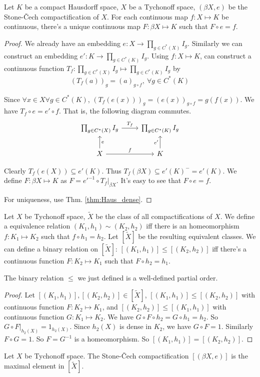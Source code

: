 \documentclass[12pt]{book}
\begin{document}
\begin{theorem}
	Let $K$ be a compact Hausdorff space, $X$ be a Tychonoff space, $(\beta X,e)$ be the Stone-\v Cech compactification of $X$. For each continuous map $f:X\mapsto K$ be continuous, there's a unique continuous map $F:\beta X\mapsto K$ such that $F\circ e=f$.
\end{theorem}

\begin{proof}
	We already have an embedding $e:X\rightarrow \prod_{g\in C^*(X)}I_g$. Similarly we can construct an embedding $e':K\rightarrow \prod_{g\in C^*(K)}I_g$. Using $f:X\mapsto K$, can construct a continuous function $T_f:\prod_{g\in C^*(X)}I_g\mapsto\prod_{g\in C^*(K)}I_g$ by
	\begin{equation}
		(T_f(a))_g=(a)_{g\circ f},\ \forall g\in  C^*(K)
	\end{equation}
	
	Since $\forall x\in X\forall g\in  C^*(K)$, $(T_f(e(x)))_g=(e(x))_{g\circ f}=g(f(x))$. We have $T_f\circ e=e'\circ f$. That is, the following diagram commutes.
	\[
	\begin{tikzcd}
		\prod_{g\in C^*(X)}I_g \arrow{r}{T_f}  & \prod_{g\in C^*(K)}I_g\\
		X \arrow{r}{f} \arrow[swap]{u}{e}& K \arrow{u}{e'} 
	\end{tikzcd}
	\]
	
	Clearly $T_f(e(X))\subseteq e'(K)$. Thus $T_f(\beta X)\subseteq e'(K)^-=e'(K)$. We define $F:\beta X\mapsto K$ as $F=e'^{-1}\circ T_f|_{\beta X}$. It's easy to see that $F\circ e=f$.
	
	For uniqueness, use Thm. \ref{thm:Haus_dense}.
\end{proof}

\begin{definition}
	Let $X$ be Tychonoff space, $\tilde X$ be the class of all compactifications of $X$. We define a equivalence relation $(K_1,h_1)\sim(K_2,h_2)$ iff there is an homeomorphism $f:K_1\mapsto K_2$ such that $f\circ h_1=h_2$. Let $[\tilde X]$ be the resulting equivalent classes. We can define a binary relation on $[\tilde X]$: $[(K_1,h_1)]\leq[(K_2,h_2)]$ iff there's a continuous function $F:K_2\mapsto K_1$ such that $F\circ h_2=h_1$.
\end{definition}   
\begin{lemma}
	The binary relation $\leq$ we just defined is a well-defined partial order.
\end{lemma}
\begin{proof}
	Let $[(K_1,h_1)],[(K_2,h_2)]\in[\tilde X]$, $[(K_1,h_1)]\leq[(K_2,h_2)]$ with continuous function $F:K_2\mapsto K_1$, and $[(K_2,h_2)]\leq[(K_1,h_1)]$ with continuous function $G:K_1\mapsto K_2$. We have $G\circ F\circ h_2=G\circ h_1=h_2$. So $G\circ F|_{h_2(X)}=1_{h_2(X)}$. Since $h_2(X)$ is dense in $K_2$, we have $G\circ F=1$. Similarly  $F\circ G=1$. So $F=G^{-1}$ is a homeomorphism. So $[(K_1,h_1)]=[(K_2,h_2)]$.
\end{proof}
\begin{theorem}
	Let $X$ be Tychonoff space. The Stone-\v Cech compactification $[(\beta X,e)]$ is the maximal element in $[\tilde X]$.
\end{theorem}
\end{document}
